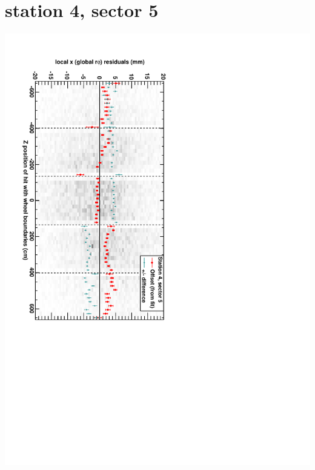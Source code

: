 \documentclass[compress]{beamer}
\begin{document}
\section*{station 4, sector 5}
\begin{frame} \vfill \mbox{\hspace{-1 cm}\includegraphics[height=1.2\linewidth, angle=90]{DTrphiVsZ_st4_sr05.pdf}} \end{frame}
\end{document}
